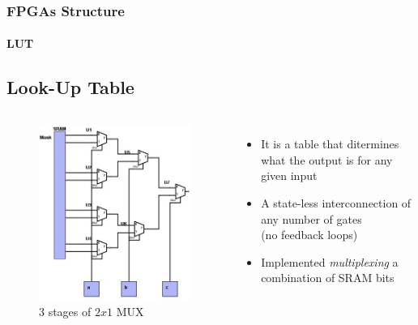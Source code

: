 \documentclass{beamer}
\begin{document}
\begin{frame}
\frametitle{FPGAs Structure}
\framesubtitle{LUT}
\subsection{Look-Up Table}


\begin{columns}[c]

\begin{figure}
\includegraphics[height=.75\textheight,left]{lutMux.jpg}
\caption{$3$ stages of $2x1$ MUX}
\end{figure}

\begin{itemize}
\item It is a \alert{table} that ditermines what the output is for any given input
\item A \alert{state-less} interconnection of any number of gates \\(no feedback loops)
\item Implemented \emph{multiplexing} a combination of SRAM bits 
\end{itemize}


\end{columns}

\end{frame}
\end{document}
